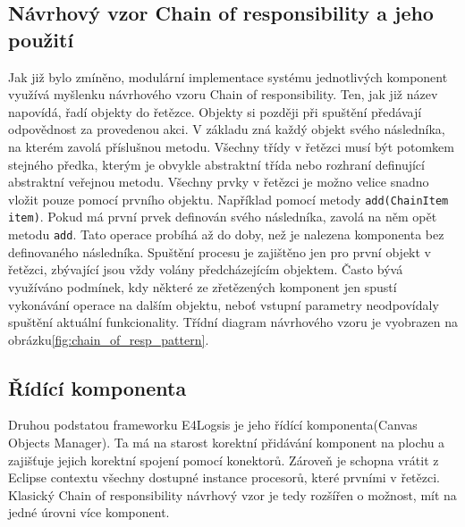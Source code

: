 \documentclass[ing,male,java,dept460]{diploma}		%
\begin{document}
\subsection{Návrhový vzor Chain of responsibility a jeho použití}
Jak již bylo zmíněno, modulární implementace systému jednotlivých komponent využívá myšlenku návrhového vzoru Chain of responsibility. Ten, jak již název napovídá, řadí objekty do řetězce. Objekty si později při spuštění předávají odpovědnost za provedenou akci. V základu zná každý objekt svého následníka, na kterém zavolá příslušnou metodu. Všechny třídy v řetězci musí být potomkem stejného předka, kterým je obvykle abstraktní třída nebo rozhraní definující abstraktní veřejnou metodu. Všechny prvky v řetězci je možno velice snadno vložit pouze pomocí prvního objektu. Například pomocí metody \texttt{add(ChainItem item)}. Pokud má první prvek definován svého následníka, zavolá na něm opět metodu \texttt{add}. Tato operace probíhá až do doby, než je nalezena komponenta bez definovaného následníka. Spuštění procesu je zajištěno jen pro první objekt v řetězci, zbývající jsou vždy volány předcházejícím objektem. Často bývá využíváno podmínek, kdy některé ze zřetězených komponent jen spustí vykonávání operace na dalším objektu, neboť vstupní parametry  neodpovídaly spuštění aktuální funkcionality\cite{chainOfResponsibility}. Třídní diagram návrhového vzoru je vyobrazen na obrázku\ref{fig:chain_of_resp_pattern}.

\subsection{Řídící komponenta}
Druhou podstatou frameworku E4Logsis je jeho řídící komponenta(Canvas Objects Manager). Ta má na starost korektní přidávání komponent na plochu a zajišťuje jejich korektní spojení pomocí konektorů. Zároveň je schopna vrátit z Eclipse contextu všechny dostupné instance procesorů, které prvními v řetězci. Klasický Chain of responsibility návrhový vzor je tedy rozšířen o možnost, mít na jedné úrovni více komponent.
\end{document}
